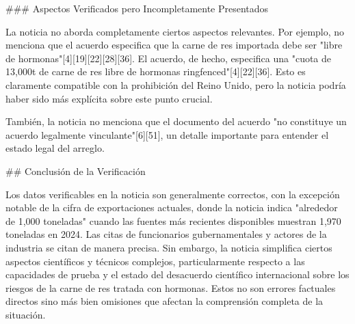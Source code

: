 \documentclass[10pt,a4paper]{article}
\begin{document}
\par\medskip
\#\#\# Aspectos Verificados pero Incompletamente Presentados
\par\medskip
La noticia no aborda completamente ciertos aspectos relevantes. Por ejemplo, no menciona que el acuerdo especifica que la carne de res importada debe ser "libre de hormonas"[4][19][22][28][36]. El acuerdo, de hecho, especifica una "cuota de 13,000t de carne de res libre de hormonas ringfenced"[4][22][36]. Esto es claramente compatible con la prohibici\'{o}n del Reino Unido, pero la noticia podr\'{i}a haber sido m\'{a}s expl\'{i}cita sobre este punto crucial.
\par\medskip
Tambi\'{e}n, la noticia no menciona que el documento del acuerdo "no constituye un acuerdo legalmente vinculante"[6][51], un detalle importante para entender el estado legal del arreglo.
\par\medskip
\#\# Conclusi\'{o}n de la Verificaci\'{o}n
\par\medskip
Los datos verificables en la noticia son generalmente correctos, con la excepci\'{o}n notable de la cifra de exportaciones actuales, donde la noticia indica "alrededor de 1,000 toneladas" cuando las fuentes m\'{a}s recientes disponibles muestran 1,970 toneladas en 2024. Las citas de funcionarios gubernamentales y actores de la industria se citan de manera precisa. Sin embargo, la noticia simplifica ciertos aspectos cient\'{i}ficos y t\'{e}cnicos complejos, particularmente respecto a las capacidades de prueba y el estado del desacuerdo cient\'{i}fico internacional sobre los riesgos de la carne de res tratada con hormonas. Estos no son errores factuales directos sino m\'{a}s bien omisiones que afectan la comprensi\'{o}n completa de la situaci\'{o}n.
\vspace{1em}

\end{document}

